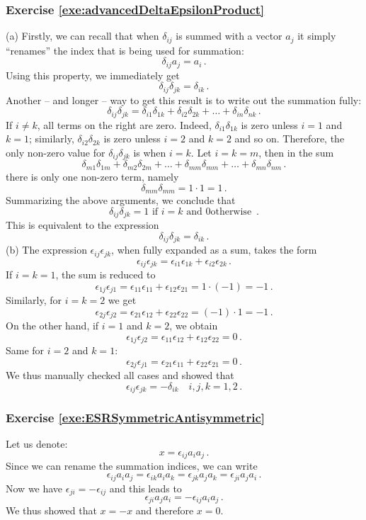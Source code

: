 \subsubsection*{Exercise \ref{exe:advancedDeltaEpsilonProduct}}
(a) Firstly, we can recall that when $\delta_{ij}$  is summed with a
vector $a_j$ it simply ``renames'' the index that is being used for
summation:
\[
\delta_{ij}a_j = a_i\,.
\]
Using this property, we immediately get
\[
\delta_{ij}\delta_{jk} = \delta_{ik}\,.
\]
Another -- and longer -- way to get this result is to write out the
summation fully:
\[
\delta_{ij}\delta_{jk} = \delta_{i1}\delta_{1k} +
\delta_{i2}\delta_{2k} + \ldots + \delta_{in}\delta_{nk}\,.
\]
If $i\ne k$, all terms on the right are zero. Indeed,
$\delta_{i1}\delta_{1k}$ is zero unless $i=1$ and $k=1$; similarly,
$\delta_{i2}\delta_{2k}$ is zero unless $i=2$ and $k=2$ and so
on. Therefore, the only non-zero value for $\delta_{ij}\delta_{jk}$ is
when $i=k$. Let $i=k=m$, then in the sum
\[
\delta_{m1}\delta_{1m} +
\delta_{m2}\delta_{2m} + \ldots + \delta_{mm}\delta_{mm}+\ldots+\delta_{mn}\delta_{nm}\,.
\]
there is only one non-zero term, namely
\[
\delta_{mm}\delta_{mm} = 1\cdot 1 = 1\,.
\]
Summarizing the above arguments, we conclude that
\[
\delta_{ij}\delta_{jk} = 1\textrm{ if }i=k\textrm{ and } 0 \textrm{
  otherwise }\,.
\]
This is equivalent to the expression
\[
\delta_{ij}\delta_{jk} = \delta_{ik}\,.
\]
(b) The expression $\epsilon_{ij}\epsilon_{jk}$, when fully expanded
as a sum, takes the form
\[
\epsilon_{ij}\epsilon_{jk} = \epsilon_{i1}\epsilon_{1k} +
\epsilon_{i2}\epsilon_{2k}\,.
\]
If $i=k=1$, the sum is reduced to
\[
\epsilon_{1j}\epsilon_{j1} = \epsilon_{11}\epsilon_{11} +
\epsilon_{12}\epsilon_{21} = 1\cdot (-1) = -1\,.
\]
Similarly, for $i=k=2$ we get
\[
\epsilon_{2j}\epsilon_{j2} = \epsilon_{21}\epsilon_{12} +
\epsilon_{22}\epsilon_{22} = (-1)\cdot 1 = -1\,.
\]
On the other hand, if $i=1$ and $k=2$, we obtain
\[
\epsilon_{1j}\epsilon_{j2} = \epsilon_{11}\epsilon_{12} +
\epsilon_{12}\epsilon_{22} = 0\,.
\]
Same for $i=2$ and $k=1$:
\[
\epsilon_{2j}\epsilon_{j1} = \epsilon_{21}\epsilon_{11} +
\epsilon_{22}\epsilon_{21} = 0\,.
\]
We thus manually checked all cases and showed that
\[
\epsilon_{ij}\epsilon_{jk}=-\delta_{ik}\quad i,j,k=1,2\,.
\]


\subsubsection*{Exercise \ref{exe:ESRSymmetricAntisymmetric}}
Let us denote:
\[
x = \epsilon_{ij}a_ia_j\,.
\]
Since we can rename the summation indices, we can write
\[
\epsilon_{ij}a_ia_j = \epsilon_{ik}a_ia_k = \epsilon_{jk}a_ja_k = \epsilon_{ji}a_ja_i\,.
\]
Now we have $\epsilon_{ji} = -\epsilon_{ij}$ and this leads to
\[
\epsilon_{ji}a_ja_i = -\epsilon_{ij}a_ia_j\,.
\]
We thus showed that $x=-x$ and therefore $x=0$.


